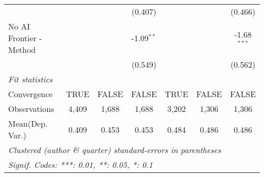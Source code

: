\begin{tabular}{lcccccc}
                           &               &               & (0.407)      &               &               & (0.466)\\   
   No AI Frontier - Method &               &               & -1.09$^{**}$ &               &               & -1.68$^{***}$\\   
                           &               &               & (0.549)      &               &               & (0.562)\\   
   \midrule
   \emph{Fit statistics}\\
   Convergence             &TRUE           & FALSE         & FALSE        & TRUE          & FALSE         & FALSE\\  
   Observations            & 4,409         & 1,688         & 1,688        & 3,202         & 1,306         & 1,306\\  
Mean(Dep. Var.) & 0.409 & 0.453 & 0.453 & 0.484 & 0.486 & 0.486 \\
   \midrule \midrule
   \multicolumn{7}{l}{\emph{Clustered (author \& quarter) standard-errors in parentheses}}\\
   \multicolumn{7}{l}{\emph{Signif. Codes: ***: 0.01, **: 0.05, *: 0.1}}\\
\end{tabular}
\par\endgroup
